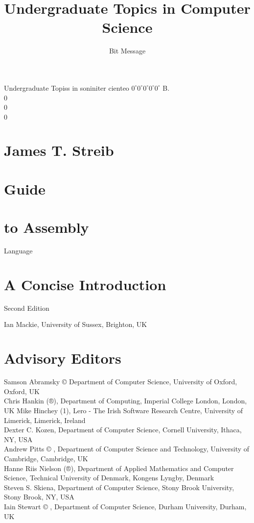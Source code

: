 \documentclass[10pt]{book}
\title{Undergraduate Topics in Computer Science }
\author{Bit Message}
\date{}
\begin{document}
\maketitle
Undergraduate Topiss in soniniter cienteo $0^{\circ} 0^{\circ} 0^{\circ} 0^{\circ} 0^{\circ}$ B.\\
0\\
0\\
0

\section*{James T. Streib}
\section*{Guide}
\section*{to Assembly}
 Language\section*{A Concise Introduction}
Second Edition


Ian Mackie, University of Sussex, Brighton, UK

\section*{Advisory Editors}
Samson Abramsky © Department of Computer Science, University of Oxford, Oxford, UK\\
Chris Hankin (®), Department of Computing, Imperial College London, London, UK Mike Hinchey (1), Lero - The Irish Software Research Centre, University of Limerick, Limerick, Ireland\\
Dexter C. Kozen, Department of Computer Science, Cornell University, Ithaca, NY, USA\\
Andrew Pitts © , Department of Computer Science and Technology, University of Cambridge, Cambridge, UK\\
Hanne Riis Nielson (®), Department of Applied Mathematics and Computer Science, Technical University of Denmark, Kongens Lyngby, Denmark\\
Steven S. Skiena, Department of Computer Science, Stony Brook University, Stony Brook, NY, USA\\
Iain Stewart © , Department of Computer Science, Durham University, Durham, UK\\
\end{document}
